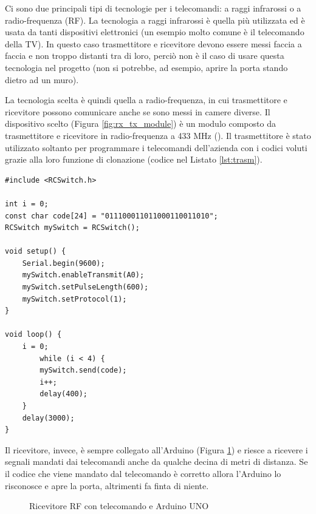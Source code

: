 \documentclass[12pt]{report}
\begin{document}
Ci sono due principali tipi di tecnologie per i telecomandi: a raggi infrarossi o a radio-frequenza (RF).
La tecnologia a raggi infrarossi è quella più utilizzata ed è usata da tanti dispositivi elettronici (un esempio molto comune è il telecomando della TV). In questo caso trasmettitore e ricevitore devono essere messi faccia a faccia e non troppo distanti tra di loro, perciò non è il caso di usare questa tecnologia nel progetto (non si potrebbe, ad esempio, aprire la porta stando dietro ad un muro).

La tecnologia scelta è quindi quella a radio-frequenza, in cui trasmettitore e ricevitore possono comunicare anche se sono messi in camere diverse. Il dispositivo scelto (Figura \ref{fig:rx_tx_module}) è un modulo composto da trasmettitore e ricevitore in radio-frequenza a 433 MHz (\cite{rf}). Il trasmettitore è stato utilizzato soltanto per programmare i telecomandi dell'azienda con i codici voluti grazie alla loro funzione di clonazione (codice nel Listato \ref{lst:trasm}).

\begin{lstlisting}[caption={L'Arduino utilizza il trasmettitore per trasmettere i codici clonati dai telecomandi. Il codice viene inviato per 4 volte ogni 3 secondi}, label={lst:trasm}]
#include <RCSwitch.h>

int i = 0;
const char code[24] = "011100011011000110011010";
RCSwitch mySwitch = RCSwitch();

void setup() {
	Serial.begin(9600);
	mySwitch.enableTransmit(A0);
	mySwitch.setPulseLength(600);
	mySwitch.setProtocol(1);
}

void loop() {
	i = 0;
		while (i < 4) {
		mySwitch.send(code);
		i++;
		delay(400);
	}
	delay(3000);
}
\end{lstlisting}

Il ricevitore, invece, è sempre collegato all'Arduino (Figura \ref{fig:rf_uno}) e riesce a ricevere i segnali mandati dai telecomandi anche da qualche decina di metri di distanza. Se il codice che viene mandato dal telecomando è corretto allora l'Arduino lo risconosce e apre la porta, altrimenti fa finta di niente. 

\begin{figure}[H]
	\caption{Ricevitore RF con telecomando e Arduino UNO}
	\label{fig:rf_uno}
\end{figure}
\end{document}
